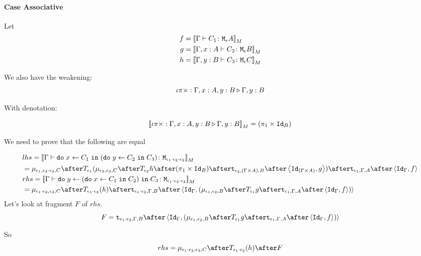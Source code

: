 {    

    \paragraph{Case Associative}
    Let
    \begin{align}
        f ={}& {\bf [\![}\Gamma \vdash C_1 \colon \texttt{M}_{\epsilon}{A}{\bf ]\!]}_M\\
        g ={}& {\bf [\![}\Gamma, x: A \vdash C_2 \colon \texttt{M}_{\epsilon}{B}{\bf ]\!]}_M\\
        h ={}& {\bf [\![}\Gamma, y: B \vdash C_3 \colon \texttt{M}_{\epsilon}{C}{\bf ]\!]}_M
    \end{align}

    We also have the weakening:
    \begin{equation}
        \iota\pi\times : \Gamma, x: A, y: B \triangleright \Gamma, y: B
    \end{equation}

    With denotation:

    \begin{equation}
        {\bf [\![}\iota\pi\times : \Gamma, x: A, y: B \triangleright \Gamma, y: B{\bf ]\!]}_M = (\pi_1 \times \texttt{Id}_{B})
    \end{equation}

    We need to prove that the following are equal

    \begin{align}
        &lhs =  \deno{\gtyperelation{\doin{x}{C_1}{(\doin{y}{C_2}{C_3})}}{\M{\e_1\dot\e_2\dot\e_2}}} \\
        & = \bind{\e_1}{\e_2\dot\e_3}{C}\after\T{
            \e_1}{(\bind{\e_2}{\e_3}{C}\after\T{\e_2}{h\after(\p \times \Id{B})}\after\tstrength{\e_2}{(\G\times A)}{B}\after\pr{\Id{(\G\times A)}}{g}
            )}\after\tstrength{\e_1}{\G}{A}\after\pr{\idg}{f}\\
        & rhs = \deno{\gtyperelation{\doin{y}{(\doin{x}{C_1}{C_2})}{C_3}}{\M{\e_1\dot\e_2\dot\e_2}}}  \\
        & = \bind{\e_1\dot\e_2}{\e_3}{C}\after\T{\e_1\dot\e_2}{(h)}\after\tstrength{\e_1\dot\e_2}{\G}{B}\after\pr{\idg}{(\bind{\e_1}{\e_2}{B}\after\T{\e_1}{g}\after\tstrength{\e_1}{\G}{A}\after\pr{\idg}{f})} \\
    \end{align}
    Let's look at fragment $F$ of $rhs$.
    \begin{equation}
        F = \tstrength{\e_1\dot\e_2}{\G}{B}\after\pr{\idg}{(\bind{\e_1}{\e_2}{B}\after\T{\e_1}{g}\after\tstrength{\e_1}{\G}{A}\after\pr{\idg}{f})}
    \end{equation}

    So 
    \begin{equation}
        rhs = \bind{\e_1\dot\e_2}{\e_3}{C}\after\T{\e_1\dot\e_2}{(h)}\after F
    \end{equation}

}
